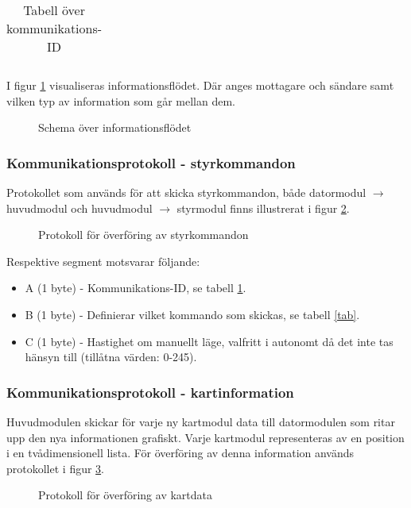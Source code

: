 \documentclass[11pt]{article}
\begin{document}
\begin{flushleft}
\begin{longtable}[l]{| l | l |}
\caption{Tabell över kommunikations-ID}\label{kommunikationstab}
\end{longtable}

I figur \ref{informationFlow} visualiseras informationsflödet. Där anges mottagare och sändare samt vilken typ av information som går mellan dem.

\begin{figure}[htbp]
\centering
\noindent\resizebox{1\linewidth}{!}{
	}
	\caption{Schema över informationsflödet\label{informationFlow}}	
\end{figure}

\subsubsection{Kommunikationsprotokoll - styrkommandon}
Protokollet som används för att skicka styrkommandon, både datormodul $\rightarrow$ huvudmodul och huvudmodul $\rightarrow$ styrmodul finns illustrerat i figur \ref{styrdata}.

\begin{figure}[htbp]
\centering
\noindent\resizebox{.8\linewidth}{!}{
	}
	\caption{Protokoll för överföring av styrkommandon\label{styrdata}}	
\end{figure}

Respektive segment motsvarar följande: 
\begin{itemize}
	\item A (1 byte) - Kommunikations-ID, se tabell \ref{kommunikationstab}.
	\item B (1 byte) - Definierar vilket kommando som skickas, se tabell \ref{tab}.
	\item C (1 byte) - Hastighet om manuellt läge, valfritt i autonomt då det inte tas hänsyn till (tillåtna värden: 0-245).
\end{itemize}

\subsubsection{Kommunikationsprotokoll - kartinformation}
Huvudmodulen skickar för varje ny kartmodul data till datormodulen som ritar upp den nya informationen grafiskt. Varje kartmodul representeras av en position i en tvådimensionell lista. För överföring av denna information används protokollet i figur \ref{kartdata}.

\begin{figure}[htbp]
\centering
\noindent\resizebox{.8\linewidth}{!}{
	}
	\caption{Protokoll för överföring av kartdata \label{kartdata}}	
\end{figure}


\end{flushleft}
\end{document}
